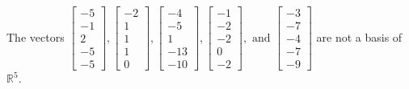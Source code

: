 \begin{exercise}
\begin{exerciseStatement}
  \end{exerciseStatement}
  \begin{exerciseAnswer}
   The vectors \(\left[\begin{array}{r}
-5 \\
-1 \\
2 \\
-5 \\
-5
\end{array}\right] , \left[\begin{array}{r}
-2 \\
1 \\
1 \\
1 \\
0
\end{array}\right] , \left[\begin{array}{r}
-4 \\
-5 \\
1 \\
-13 \\
-10
\end{array}\right] , \left[\begin{array}{r}
-1 \\
-2 \\
-2 \\
0 \\
-2
\end{array}\right] , \text{ and } \left[\begin{array}{r}
-3 \\
-7 \\
-4 \\
-7 \\
-9
\end{array}\right]\) 
  	 are not  a basis of \(\mathbb{R}^5\).
  


  \end{exerciseAnswer}
\end{exercise}